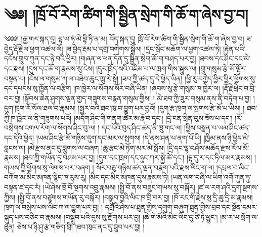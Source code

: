 \chapter{༄༅། །ཁྲོ་བོ་རེག་ཚིག་གི་སྦྱིན་སྲེག་གི་ཆོ་ག་ཞེས་བྱ་བ།}༄༅༅། །རྒྱ་གར་སྐད་དུ། བྷ་ཡ་ཧཾ་མེ་བྷི་ཏི་ན་མ། བོད་སྐད་དུ། ཁྲོ་བོ་རེག་ཚིག་གི་སྦྱིན་སྲེག་གི་ཆོ་ག་ཞེས་བྱ་བ། ཟ་བྱེད་རྡོ་རྗེ་ལ་ཕྱག་འཚལ་ལོ། །ཟ་བྱེད་རྔམ་པ་དགྲ་བགེགས་སྒྲོལ། །དྲང་སྲོང་མཆོག་ལ་ཕྱག་འཚལ་ཏེ། །རྟེན་པའི་དངོས་གྲུབ་ཀུན་དང་ཉེ་བའི་ཕྱིར། །གཞན་ལ་ཕན་དོན་དུ་སྦྱིན་སྲེག་ཆོ་ག་བཤད་པར་བྱ། །ཐབས་དང་ཤིང་དང་མེ་དང་རྫས། །དུས་དང་ཆོ་ག་རྣམས་སུ་ངེས། །དུར་ཁྲོད་སའི་འཇིམ་པ་ལ་ཁྲག་གིས་སྦྲུས་ལ། །གྲུ་གསུམ་རྩེ་མོ་ལྷོར་བསྟན་པ། །ངོས་ལ་གསུམ་ཀ་ལ་འཐེབ་ཆུང་ཁྲུ་རེ་སྟེ། །ཟབ་ཀྱི་ཚད་དུ་དེ་ཕྱེད་ཡིན། །ཕྱི་རུ་བཀྱེད་ཕྱིར་ཕྱིར་ཕྱོགས་སུ་དང་དཔངས་སུ་ཁྱོན་ལ་བརྩིག །ཁ་ཁྱེར་ལ་སོགས་སོར་བཞི་ཡིན། །ཞབས་སུ་རྩེ་གསུམ་ཁ་ཁྱེར་ལ། །རྡོ་རྗེ་ཕྲེང་བ་བྲི་བར་བྱ། །སྟོབས་ཆེན་ཤུགས་ལྡན་གྱད་གཟུགས་བརྙན་གསུམ་གྱིས། ། མེ་ཐབ་ཀྱི་ཟུར་གསུམ་ནས་ནི་བཏེག་པ་བྱ། །དུག་ཁྲག་རོ་སོལ་ཐལ་བ་རྣམས། །སྦྱར་བའི་ཐབ་ཁུ་བ་བྱུག་པར་བྱའོ། །དུག་རྩ་ཁྲག་ལ་སྤགས་རྩེ་མོ་པ་ཡིས། ། ཐབ་ཀྱི་ཁ་ཁྱེར་ལ་ནི་གཟུགས་པའོ། །མདོག་ཤིང་གི་གནག་ཚེར་མ་རྣོ་བ་དང་། །དྲི་ངན་སྲིན་བུས་ཟོས་པ་དང་། །རོ་བསྲེགས་འགལ་རོག་ལ་སོགས་ཤིང་བུ་ལ། ། དང་པོའི་བུད་ཤིང་ཚད་ནི་ཁྲུ་གང་ལ། །ཕྱིས་བསྣན་པ་ཡམ་ཤིང་ཚད་དང་དེའི་ཕྱེད། །ཡམ་ཤིང་རྩེ་མོ་གཉིས་དུག་དང་མར་ལ་སྤགས། །དེ་ནས་ཤན་པ་ནག་པོ་ཡི། །ཁྱིམ་ནས་ཉི་ཕྱེད་མེ་བླངས་ལ། །མེ་རྫས་ནང་དུ་བླུགས་ལ་བཞག །ཆུ་རྩང་མེ་ཏོག་མར་མེ་སྤོས། །དྲི་དང་ལྷ་བཤོས་མཆོད་རྫས་རོལ་མོ་རྣམས། །ཐབ་ཀྱི་གཡོན་དུ་བཤམ་པར་བྱ། །དུག་དང་ཁྲག་དང་ཉུང་ཀར་སྐྱེ་ཚེ་དང་། །དྷ་དུ་ར་དང་ཏིལ་མར་རྣམས། །གཡས་ཀྱི་ཕྱོགས་སུ་ལེགས་པར་བཞག ། སོར་བཅུ་གཉིས་ཚད་ལྡན་བརྣག་པའི་རྫས་ལིང་ག་ལ། །དཔྲལ་བ་མིང་བཀོག་མ་མིང་མཁན་སྙིང་ཁ་རུས་རུ། །མིང་དང་མིང་མཁན་དུས་རྣམས་ཏེ། །ཡན་ལག་བཞི་ལ་ཡིག་འགོ་ཀུན་ཏུ་བསྟན་ཛ་དང་རཾ། །ཡེ་ཤེས་ཁྲོ་བོ་སྔགས་འབྲུ་རྣམས། །སྤྱི་བོ་ནས་བཟུང་གཡས་སུ་བསྐོར། །ཛ་ལ་རག་ཤའི་དྲག་སྔགས་ཀྱིས། །སྤྱི་བོ་ནས་བཙུགས་གཡོན་རུ་བསྐོར། །བསྒྲུབ་བྱའི་ལིང་ཁ་བྲི་བར་བྱ། །ཁོ་རང་གི་རྗེས་སུ་དྲི་ཆུ་དྲི་མ་རྣམས། ཁྲག་ལ་བསྲེས་པས་ལིང་ཀ་ལ་བྱུག་པར་བྱ། ། དགྲའི་ཤེས་པ་ཐུན་གྱིས་དགུག་བཞུག་ཐུན་གྱིས་བྲབ་དང་སྔོན་དམར་སྐུད་པས་བཅིང་བ་རྣམས། །བསྒྲུབ་པའི་དུས་སུ་རྫོགས་པར་བྱ། །ཆེ་གེ་མོའི་མིང་ལིང་དུ་ཙི་ཏེ་ཕྱུང་། །མ་ར་ཡ་སྲོག་ལ་ཐུན། ཅེས་པ་ཉི་ཤུ་རྩ་གཅིག་བྲི། །ཐབ་ཁུང་ནང་དུ་བྲུབ་པར་བྱ། །
